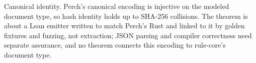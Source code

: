 \begin{perchstatement}{}{Canonical identity.}\label{stmt:canonical-identity}
Perch's canonical encoding is injective on the modeled document type, so hash identity holds up to SHA-256 collisions. The theorem is about a Lean emitter written to match Perch's Rust  and linked to it by golden fixtures and fuzzing, not extraction; JSON parsing and compiler correctness need separate assurance, and no theorem connects this encoding to rule-core's document type.
\end{perchstatement}

